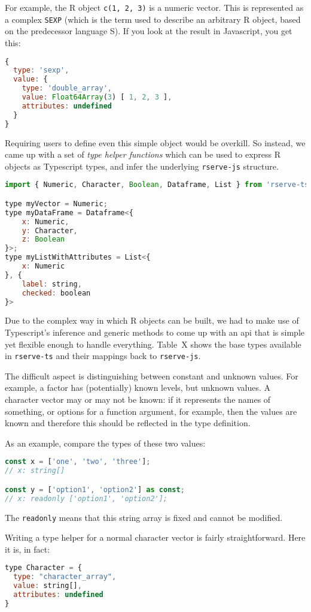 \documentclass{article}
\newcommand{\pkg}[1]{\texttt{#1}}
\newcommand{\cmd}[1]{\texttt{#1}}
\newcommand{\prog}[1]{{\sf #1}}
\newcommand{\proglang}[1]{\prog{#1}}
\newcommand{\R}{\prog{R}}
\begin{document}
For example, the \R{} object \cmd{c(1, 2, 3)} is a numeric vector.
This is represented as a complex \cmd{SEXP} (which is the term used to describe an arbitrary \R{} object, based on the predecessor language \proglang{S}).
If you look at the result in Javascript, you get this:
\begin{lstlisting}[language=Javascript]
{
  type: 'sexp',
  value: {
    type: 'double_array',
    value: Float64Array(3) [ 1, 2, 3 ],
    attributes: undefined
  }
}
\end{lstlisting}
Requiring users to define even this simple object would be overkill.
So instead, we came up with a set of \emph{type helper functions} which can be used to express \R{} objects as Typescript types, and infer the underlying \pkg{rserve-js} structure.
\begin{lstlisting}[language=Javascript]
import { Numeric, Character, Boolean, Dataframe, List } from 'rserve-ts';

type myVector = Numeric;
type myDataFrame = Dataframe<{
    x: Numeric,
    y: Character,
    z: Boolean
}>;
type myListWithAttributes = List<{
    x: Numeric
}, {
    label: string,
    checked: boolean
}>
\end{lstlisting}

Due to the complex way in which \R{} objects can be built, we had to make use of Typescript's inference and generic methods to come up with an \gls{api} that is simple yet flexible enough to handle everything.
Table~X shows the base types available in \pkg{rserve-ts} and their mappings back to \pkg{rserve-js}.

The difficult aspect is distinguishing between constant and unknown values.
For example, a factor has (potentially) known levels, but unknown values.
A character vector may or may not be known:
if it represents the names of something, or options for a function argument, for example, then the values are known and therefore this should be reflected in the type definition.

As an example, compare the types of these two values:
\begin{lstlisting}[language=Javascript]
const x = ['one', 'two', 'three'];
// x: string[]

const y = ['option1', 'option2'] as const;
// x: readonly ['option1', 'option2'];
\end{lstlisting}
The \cmd{readonly} means that this string array is fixed and cannot be modified.

Writing a type helper for a normal character vector is fairly straightforward.
Here it is, in fact:
\begin{lstlisting}[language=Javascript]
type Character = {
  type: "character_array",
  value: string[],
  attributes: undefined
}
\end{lstlisting}
\end{document}
